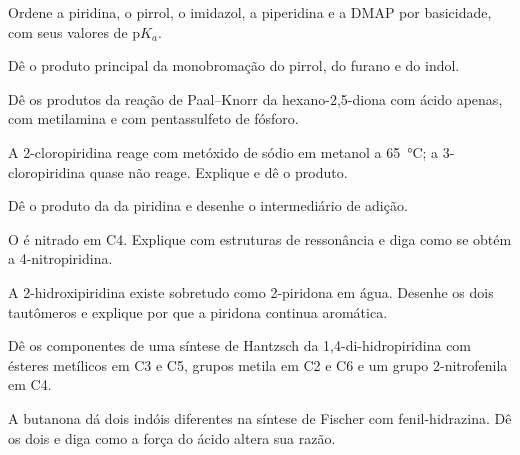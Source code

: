 \begin{exercise}[$\star$]\label{exo:b3:heterocycles:2}
Ordene a piridina, o pirrol, o imidazol, a piperidina e a DMAP por basicidade, com seus
valores de $\mathrm pK_a$.
\end{exercise}

\begin{exercise}[$\star$]\label{exo:b3:heterocycles:3}
Dê o produto principal da monobromação do pirrol, do furano e do indol.
\end{exercise}

\begin{exercise}[$\star$]\label{exo:b3:heterocycles:4}
Dê os produtos da reação de Paal--Knorr da hexano-2,5-diona com ácido apenas,
com metilamina e com pentassulfeto de fósforo.
\end{exercise}

\begin{exercise}[$\star\star$]\label{exo:b3:heterocycles:5}
A 2-cloropiridina reage com metóxido de sódio em metanol a \qty{65}{\celsius}; a 3-cloropiridina
quase não reage. Explique e dê o produto.
\end{exercise}

\begin{exercise}[$\star\star$]\label{exo:b3:heterocycles:6}
Dê o produto da  da piridina e desenhe o intermediário de
adição.
\end{exercise}

\begin{exercise}[$\star\star$]\label{exo:b3:heterocycles:7}
O  é nitrado em C4. Explique com estruturas de ressonância e diga como
se obtém a 4-nitropiridina.
\end{exercise}

\begin{exercise}[$\star\star$]\label{exo:b3:heterocycles:8}
A 2-hidroxipiridina existe sobretudo como 2-piridona em água. Desenhe os dois tautômeros e
explique por que a piridona continua aromática.
\end{exercise}

\begin{exercise}[$\star\star$]\label{exo:b3:heterocycles:9}
Dê os componentes de uma síntese de Hantzsch da 1,4-di-hidropiridina com
ésteres metílicos em C3 e C5, grupos metila em C2 e C6 e um grupo 2-nitrofenila
em C4.
\end{exercise}

\begin{exercise}[$\star\star\star$]\label{exo:b3:heterocycles:10}
A butanona dá dois indóis diferentes na síntese de Fischer com
fenil-hidrazina. Dê os dois e diga como a força do ácido altera sua razão.
\end{exercise}

